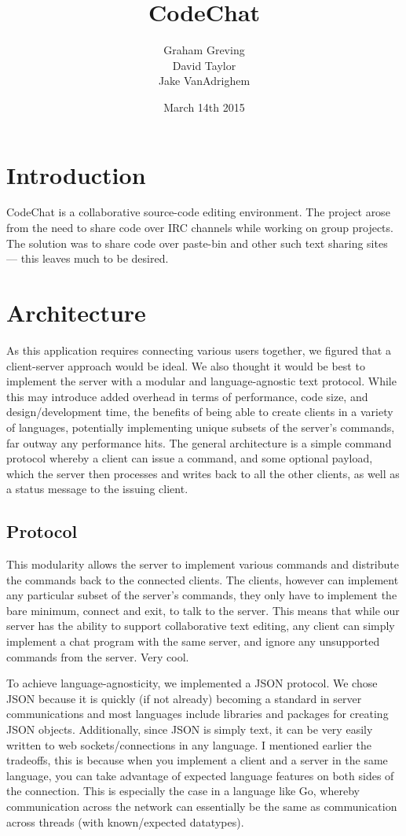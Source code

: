 \documentclass[10pt, letterpaper]{article}
\title{CodeChat}
\author{Graham Greving \\ David Taylor \\ Jake VanAdrighem}
\date{March 14th 2015}
\begin{document}
\maketitle

\section*{Introduction}

CodeChat is a collaborative source-code editing environment. The project 
arose from the need to share code over IRC channels while working on group 
projects. The solution was to share code over paste-bin and other such text 
sharing sites --- this leaves much to be desired.

\section*{Architecture}

As this application requires connecting various users together, we figured 
that a client-server approach would be ideal. We also thought it would be 
best to implement the server with a modular and language-agnostic text 
protocol. While this may introduce added overhead in terms of performance, 
code size, and design/development time, the benefits of being able to create 
clients in a variety of languages, potentially implementing unique 
subsets of the server's commands, far outway any performance hits. The 
general architecture is a simple command protocol whereby a client can 
issue a command, and some optional payload, which the server then processes  
and writes back to all the other clients, as well as a status message to the 
issuing client.

\subsection*{Protocol}

This modularity allows the server to implement various commands and 
distribute the commands back to the connected clients. The clients, however 
can implement any particular subset of the server's commands, they only have 
to implement the bare minimum, connect and exit, to talk to the server. This 
means that while our server has the ability to support collaborative text 
editing, any client can simply implement a chat program with the same server, 
and ignore any unsupported commands from the server. Very cool.

To achieve language-agnosticity, we implemented a JSON protocol. We chose 
JSON because it is quickly (if not already) becoming a standard in server 
communications and most languages include libraries and packages for creating 
JSON objects. Additionally, since JSON is simply text, it can be very easily 
written to web sockets/connections in any language. I mentioned earlier the 
tradeoffs, this is because when you implement a client and a server in the 
same language, you can take advantage of expected language features on both 
sides of the connection. This is especially the case in a language like Go, 
whereby communication across the network can essentially be the same as 
communication across threads (with known/expected datatypes).
\end{document}
